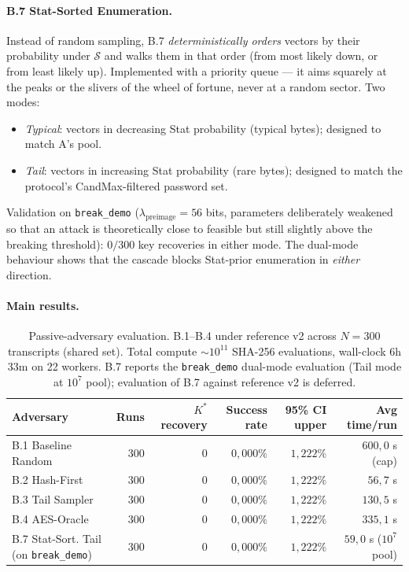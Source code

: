 \documentclass[11pt,a4paper]{article}
\begin{document}
\paragraph{B.7 Stat-Sorted Enumeration.} Instead of random sampling, B.7 \emph{deterministically orders} vectors by their probability under $\mathcal{S}$ and walks them in that order (from most likely down, or from least likely up). Implemented with a priority queue --- it aims squarely at the peaks or the slivers of the wheel of fortune, never at a random sector. Two modes:
\begin{itemize}[leftmargin=*]
\item \emph{Typical}: vectors in decreasing Stat probability (typical bytes); designed to match A's pool.
\item \emph{Tail}: vectors in increasing Stat probability (rare bytes); designed to match the protocol's CandMax-filtered password set.
\end{itemize}
Validation on \texttt{break\_demo} ($\lambda_\text{preimage}=56$ bits, parameters deliberately weakened so that an attack is theoretically close to feasible but still slightly above the breaking threshold): $0/300$ key recoveries in either mode. The dual-mode behaviour shows that the cascade blocks Stat-prior enumeration in \emph{either} direction.

\paragraph{Main results.}

\begin{table}[ht]
\centering
\small
\begin{tabular}{lrrrrr}
\toprule
Adversary & Runs & $K^*$ recovery & Success rate & 95\% CI upper & Avg time/run \\
\midrule
B.1 Baseline Random & 300 & 0 & $0{,}000\%$ & $1{,}222\%$ & $600{,}0$ s (cap) \\
B.2 Hash-First & 300 & 0 & $0{,}000\%$ & $1{,}222\%$ & $56{,}7$ s \\
B.3 Tail Sampler & 300 & 0 & $0{,}000\%$ & $1{,}222\%$ & $130{,}5$ s \\
B.4 AES-Oracle & 300 & 0 & $0{,}000\%$ & $1{,}222\%$ & $335{,}1$ s \\
B.7 Stat-Sort. Tail (on \texttt{break\_demo}) & 300 & 0 & $0{,}000\%$ & $1{,}222\%$ & $59{,}0$ s ($10^7$ pool) \\
\bottomrule
\end{tabular}
\caption{Passive-adversary evaluation. B.1--B.4 under reference v2 across $N=300$ transcripts (shared set). Total compute $\sim 10^{11}$ SHA-256 evaluations, wall-clock 6h 33m on 22 workers. B.7 reports the \texttt{break\_demo} dual-mode evaluation (Tail mode at $10^7$ pool); evaluation of B.7 against reference v2 is deferred.}
\label{tab:pop-attackers}
\end{table}
\end{document}

